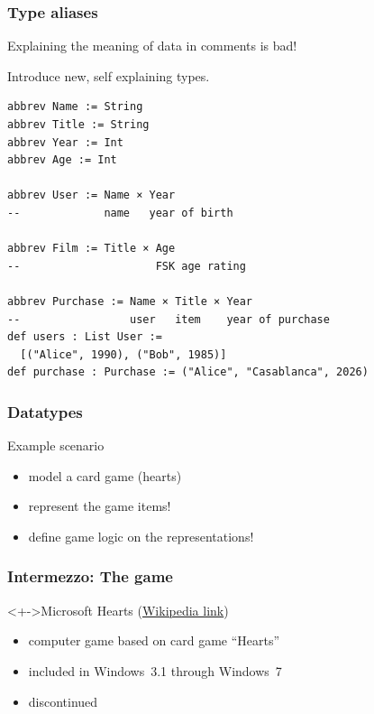 \documentclass{beamer}
\subtitle{Type definitions}
\begin{document}
\begin{frame}
  \titlepage
\end{frame}
\begin{frame}[fragile]
  \frametitle{Type aliases}
Explaining the meaning of data in comments is bad!

Introduce new, self explaining types.
\begin{lstlisting}
abbrev Name := String
abbrev Title := String
abbrev Year := Int
abbrev Age := Int

abbrev User := Name × Year
--             name   year of birth

abbrev Film := Title × Age
--                     FSK age rating

abbrev Purchase := Name × Title × Year
--                 user   item    year of purchase
def users : List User :=
  [("Alice", 1990), ("Bob", 1985)]
def purchase : Purchase := ("Alice", "Casablanca", 2026)
\end{lstlisting}
\end{frame}
\begin{frame}[fragile]
  \frametitle{Datatypes}
  \begin{block}{Example scenario}
    \begin{itemize}
    \item model a card game (hearts)
    \item represent the game items!
    \item define game logic on the representations!
    \end{itemize}
  \end{block}
\end{frame}
\begin{frame}
  \frametitle{Intermezzo: The game}
  \begin{block}<+->{Microsoft Hearts (\href{https://en.wikipedia.org/wiki/Microsoft_Hearts}{Wikipedia link})}
    \begin{itemize}
    \item computer game based on card game ``Hearts''
    \item included in Windows~3.1 through Windows~7
    \item discontinued
    \end{itemize}    
  \end{block}
\end{frame}
\end{document}
